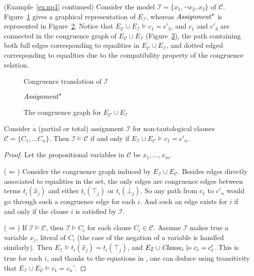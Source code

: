 \documentclass[smallextended]{svjour3}
\begin{document}
\begin{example}\label{ex:np2} (Example~\ref{ex:np1} continued)  
Consider the model $\mathcal{I} = \{x_1, \neg x_2, x_3\}$ of\/ $\mathcal{C}$.
Figure~\ref{fig:npassignment} gives a graphical representation of
$E_{\mathcal{I}}$, whereas ${\it Assignment}^\star$ is represented in
Figure~\ref{fig:npassignmentstar}.  Notice that
$E_{\mathcal{C}} \cup E_{\mathcal{I}} \models c_1 = c'_3$,
and $c_1$ and $c'_3$ are connected in the congruence graph
of $E_{\mathcal{C}} \cup E_{\mathcal{I}}$ (Figure~\ref{fig:npmodel}), the path containing both full edges corresponding to equalities in $E_{\mathcal{C}} \cup E_{\mathcal{I}}$, and dotted edged corresponding to equalities due to the compatibility property of the congruence relation.

\begin{figure}[ht]

\caption{Congruence translation of $\mathcal{I}$}
\label{fig:npassignment}
\end{figure}

\begin{figure}[ht]

\caption{${\it Assignment}^\star$}
\label{fig:npassignmentstar}
\end{figure}

\begin{figure}[ht]

\caption{The congruence graph for $E_{\mathcal{C}} \cup E_{\mathcal{I}}$}
\label{fig:npmodel}
\end{figure}
\end{example}

\begin{lemma}
\label{lemma:eqv}
Consider a (partial or total) assignment $\mathcal{I}$ for non-tautological
clauses $\mathcal{C}= \{C_1, \dots C_n\}$.  Then $\mathcal{I} \models
\mathcal{C}$ if and only if $E_{\mathcal{I}} \cup E_\mathcal{C} \models c_1 =
c'_n$.
\end{lemma}
\begin{proof}

Let the propositional variables in $\mathcal{C}$ be $x_1,\ldots, x_m$.

($\Leftarrow$)  Consider the congruence graph induced by
$E_{\mathcal{I}} \cup E_\mathcal{C}$.  Besides edges directly associated to
equalities in the set, the only edges are congruence edges between terms
$t_i(\hat{x}_j)$ and either $t_i(\top_j)$ or $t_i(\bot_j)$.  So any path from
$c_1$ to $c'_n$ would go through such a congruence edge for each $i$.
And such an edge exists for $i$ if and only if the clause $i$ is satisfied by
$\mathcal{I}$.

($\Rightarrow$)  If $\mathcal{I} \models \mathcal{C}$, then
$\mathcal{I} \models C_i$ for each clause $C_i \in \mathcal{C}$.  Assume
$\mathcal{I}$ makes true a variable $x_j$, literal of $C_i$ (the case of
the negation of a variable is handled similarly).  Then $E_{\mathcal{I}} \models
t_i(\hat{x}_j) = t_i(\top_j)$, and $E_{\mathcal{I}} \cup {\it Clause}_i
\models c_i = c_i'$.  This is true for each $i$, and
thanks to the equations in \Connect, one can deduce using transitivity that
$E_{\mathcal{I}} \cup E_\mathcal{C} \models c_1 = c_n'$.

\end{proof}
\end{document}
